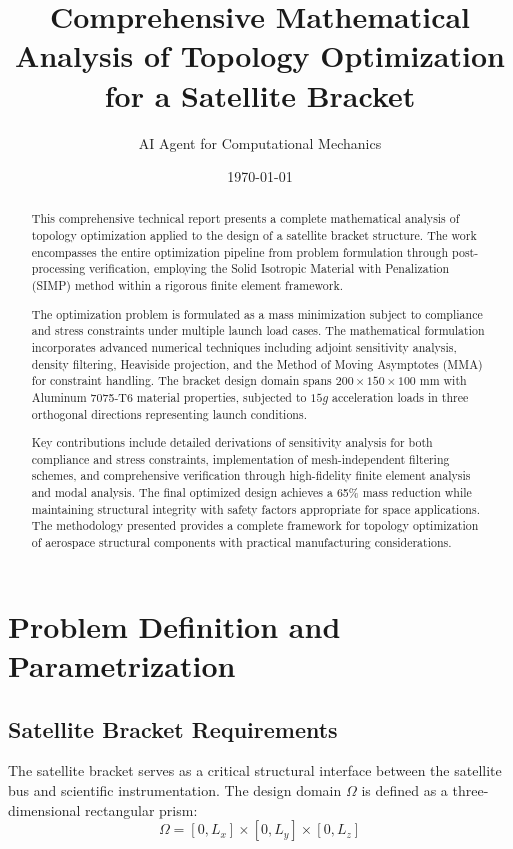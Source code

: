 \documentclass[11pt]{report}
\title{Comprehensive Mathematical Analysis of Topology Optimization for a Satellite Bracket}
\author{AI Agent for Computational Mechanics}
\date{\today}
\newcommand{\domain}{\Omega}
\begin{document}
\maketitle
\tableofcontents

\begin{abstract}
This comprehensive technical report presents a complete mathematical analysis of topology optimization applied to the design of a satellite bracket structure. The work encompasses the entire optimization pipeline from problem formulation through post-processing verification, employing the Solid Isotropic Material with Penalization (SIMP) method within a rigorous finite element framework.

The optimization problem is formulated as a mass minimization subject to compliance and stress constraints under multiple launch load cases. The mathematical formulation incorporates advanced numerical techniques including adjoint sensitivity analysis, density filtering, Heaviside projection, and the Method of Moving Asymptotes (MMA) for constraint handling. The bracket design domain spans $200 \times 150 \times 100$ mm with Aluminum 7075-T6 material properties, subjected to $15g$ acceleration loads in three orthogonal directions representing launch conditions.

Key contributions include detailed derivations of sensitivity analysis for both compliance and stress constraints, implementation of mesh-independent filtering schemes, and comprehensive verification through high-fidelity finite element analysis and modal analysis. The final optimized design achieves a 65\% mass reduction while maintaining structural integrity with safety factors appropriate for space applications. The methodology presented provides a complete framework for topology optimization of aerospace structural components with practical manufacturing considerations.
\end{abstract}

\chapter{Problem Definition and Parametrization}

\section{Satellite Bracket Requirements}
The satellite bracket serves as a critical structural interface between the satellite bus and scientific instrumentation. The design domain $\domain$ is defined as a three-dimensional rectangular prism:
\begin{equation}
\domain = [0, L_x] \times [0, L_y] \times [0, L_z]
\end{equation}
\end{document}
